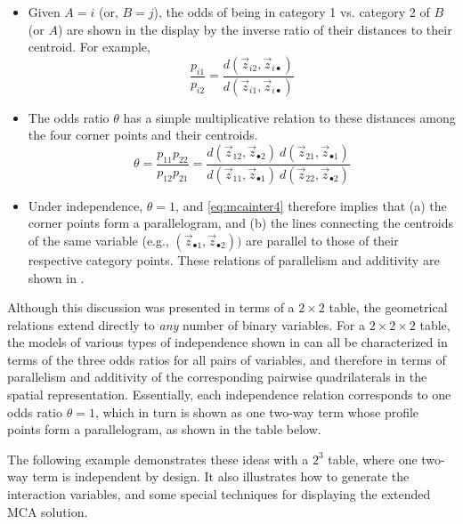 \begin{itemize}
\item Given $A=i$ (or, $B=j$), the odds of being in category 1 vs. category 2
of $B$ (or $A$) are shown in the display by the inverse ratio of their
distances to their centroid.  For example,
\begin{equation*}%
  \frac{p_{i1}}{p_{i2}} =
  \frac{ d( \vec{z}_{i2}, \vec{z}_{i \bullet} ) }
       { d( \vec{z}_{i1}, \vec{z}_{i \bullet} ) }
\end{equation*}
\item The odds ratio $\theta$ has a simple multiplicative relation
to these distances among the four corner points and their
centroids.
\begin{equation}\label{eq:mcainter4}
  \theta =
  \frac{p_{11} p_{22}}{p_{12} p_{21}} =
  \frac{ d( \vec{z}_{12}, \vec{z}_{\bullet 2}) \: d( \vec{z}_{21}, \vec{z}_{\bullet 1} )}
       { d( \vec{z}_{11}, \vec{z}_{\bullet 1}) \: d( \vec{z}_{22}, \vec{z}_{\bullet 2} )}
\end{equation}
\item Under independence, $\theta =1$, and \eqref{eq:mcainter4}
therefore implies that
(a) the corner points form a parallelogram, and
(b) the lines connecting the centroids of the same variable
(e.g., $(\vec{z}_{\bullet 1}, \vec{z}_{\bullet 2}))$ are parallel
to those of their respective category points.
These relations of parallelism and additivity are shown in .
\end{itemize}

Although this discussion was presented
in terms of a $2 \times 2$ table, the geometrical relations extend
directly to \emph{any} number of binary variables.
For a $2 \times 2 \times 2$ table,  the models of various types of
independence shown in  can all be characterized
in terms of the three odds ratios for all pairs of variables, and
therefore in terms of parallelism and additivity of the corresponding
pairwise quadrilaterals in the spatial representation.
Essentially, each independence relation corresponds to one odds ratio $\theta=1$,
which in turn is shown as one two-way term whose profile points form
a parallelogram, as shown in the table below.


The following example demonstrates these ideas with a $2^3$ table, where
one two-way term is independent by design.
It also illustrates how to generate the interaction
variables, and some special techniques for displaying the extended
MCA solution.

